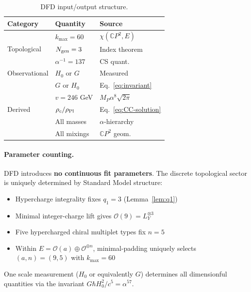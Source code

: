 \begin{table}[h]
\centering
\caption{DFD input/output structure.}\label{tab:parameter-count}
\begin{ruledtabular}
\scriptsize
\begin{tabular}{lll}
\textbf{Category} & \textbf{Quantity} & \textbf{Source} \\
\hline
\multirow{3}{*}{Topological} & $k_{\max} = 60$ & $\chi(\mathbb{C}P^2, E)$ \\
 & $N_{\rm gen} = 3$ & Index theorem \\
 & $\alpha^{-1} = 137$ & CS quant. \\
\hline
Observational & $H_0$ or $G$ & Measured \\
\hline
\multirow{5}{*}{Derived} & $G$ or $H_0$ & Eq.~\eqref{eq:invariant} \\
 & $v = 246$ GeV & $M_P \alpha^8 \sqrt{2\pi}$ \\
 & $\rho_c/\rho_{\rm Pl}$ & Eq.~\eqref{eq:CC-solution} \\
 & All masses & $\alpha$-hierarchy \\
 & All mixings & $\mathbb{C}P^2$ geom. \\
\end{tabular}
\end{ruledtabular}
\end{table}

\paragraph{Parameter counting.}
DFD introduces \textbf{no continuous fit parameters}. The discrete topological sector is uniquely determined by Standard Model structure:
\begin{itemize}
\item Hypercharge integrality fixes $q_1 = 3$ (Lemma~\ref{lem:q1})
\item Minimal integer-charge lift gives $\mathcal{O}(9) = L_Y^{\otimes 3}$
\item Five hypercharged chiral multiplet types fix $n = 5$
\item Within $E = \mathcal{O}(a) \oplus \mathcal{O}^{\oplus n}$, minimal-padding uniquely selects $(a,n) = (9,5)$ with $k_{\max} = 60$
\end{itemize}

One scale measurement ($H_0$ or equivalently $G$) determines all dimensionful quantities via the invariant $G\hbar H_0^2/c^5 = \alpha^{57}$.

